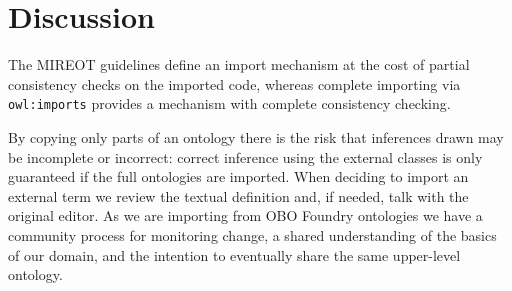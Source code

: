 \documentclass[a4paper,10pt,twocolumn]{article}
\begin{document}

\section*{Discussion}

The MIREOT guidelines define an import mechanism at the cost of partial consistency checks on the imported code, whereas complete importing via \texttt{owl:imports} provides a mechanism with complete consistency checking.


By copying only parts of an ontology there is the risk that inferences drawn may be incomplete or incorrect: correct inference using the external classes is only guaranteed if the full ontologies are imported.
When deciding to import an external term we review the textual definition and, if needed, talk with the original editor.
As we are importing from OBO Foundry ontologies we have a community process for monitoring change, a shared understanding of the basics of our domain, and the intention to eventually share the same upper-level ontology. 
\end{document}
